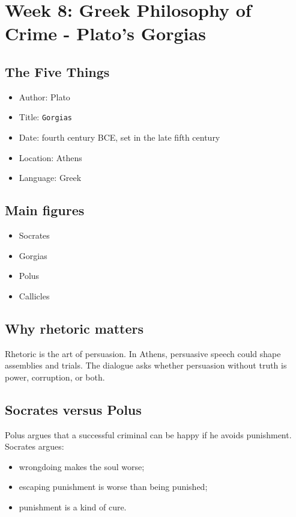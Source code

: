 \documentclass[11pt]{article}
\begin{document}
\section{Week 8: Greek Philosophy of Crime - Plato's Gorgias}

\subsection{The Five Things}

\begin{itemize}
\item Author: Plato
\item Title: \texttt{Gorgias}
\item Date: fourth century BCE, set in the late fifth century
\item Location: Athens
\item Language: Greek
\end{itemize}

\subsection{Main figures}

\begin{itemize}
\item Socrates
\item Gorgias
\item Polus
\item Callicles
\end{itemize}

\subsection{Why rhetoric matters}

Rhetoric is the art of persuasion. In Athens, persuasive speech could shape assemblies and trials. The dialogue asks whether persuasion without truth is power, corruption, or both.

\subsection{Socrates versus Polus}

Polus argues that a successful criminal can be happy if he avoids punishment. Socrates argues:

\begin{itemize}
\item wrongdoing makes the soul worse;
\item escaping punishment is worse than being punished;
\item punishment is a kind of cure.
\end{itemize}
\end{document}
